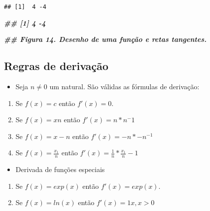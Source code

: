 \documentclass[
]{article}
\newenvironment{Shaded}{\begin{snugshade}}{\end{snugshade}}
\newcommand{\DocumentationTok}[1]{\textcolor[rgb]{0.56,0.35,0.01}{\textbf{\textit{#1}}}}
\providecommand{\tightlist}{%
  \setlength{\itemsep}{0pt}\setlength{\parskip}{0pt}}
\begin{document}
\begin{verbatim}
## [1]  4 -4
\end{verbatim}

\begin{Shaded}
\begin{Highlighting}[]
\DocumentationTok{\#\# [1] 4 {-}4}
\end{Highlighting}
\end{Shaded}

\begin{Shaded}
\begin{Highlighting}[]
\DocumentationTok{\#\# Figura 14. Desenho de uma função e retas tangentes.}
\end{Highlighting}
\end{Shaded}

\hypertarget{regras-de-derivauxe7uxe3o}{%
\subsection{Regras de derivação}\label{regras-de-derivauxe7uxe3o}}

\begin{itemize}
\tightlist
\item
  Seja \(n \neq 0\) um natural. São válidas as fórmulas de derivação:
\end{itemize}

\begin{enumerate}
\def\labelenumi{\arabic{enumi}.}
\tightlist
\item
  Se \(f(x) = c\) então \(f′(x) = 0\).
\item
  Se \(f(x) = xn\) então \(f′(x) = n * n^-1\)
\item
  Se \(f(x) = x-n\) então \(f′(x) = -n * -n^{-1}\)
\item
  Se \(f(x) = \frac{x_1}{n}\) então
  \(f′(x) = \frac{1}{n} * \frac{x_1}{n} -1\)
\end{enumerate}

\begin{itemize}
\tightlist
\item
  Derivada de funções especiais
\end{itemize}

\begin{enumerate}
\def\labelenumi{\arabic{enumi}.}
\setcounter{enumi}{4}
\tightlist
\item
  Se \(f(x) = exp(x)\) então \(f′(x) = exp(x)\).
\item
  Se \(f(x) = ln(x)\) então \(f′(x) = 1x, x > 0\)
\end{enumerate}
\end{document}
